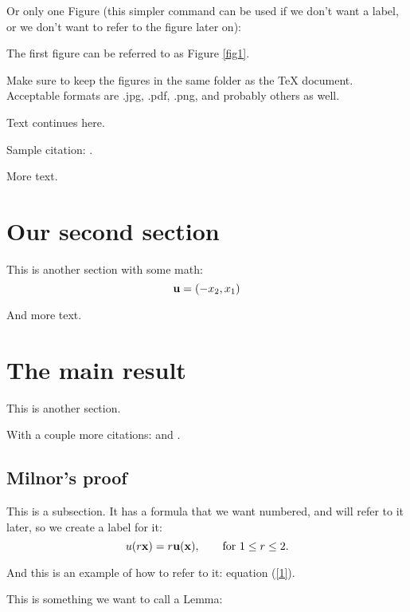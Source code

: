 \documentclass{amsart}
\theoremstyle{definition}
\numberwithin{equation}{section}
\def\ve#1{{\bf #1}}
\begin{document}
\begin{sansmath}
Or only one Figure
(this simpler command can be used if we don't want a label,
or we don't want to refer to the figure later on):

\medskip




The first figure can be referred to as  Figure \ref{fig1}.

Make sure to keep the figures in the same folder as the TeX document.
Acceptable formats are .jpg, .pdf, .png, and probably others as well.

Text continues here.

Sample citation:  \cite{alexandrov}.

More text.

\section{Our second section}

This is another section
with some math:
    $$ \ve u = (-x_2, x_1) $$


And more text.
    \medskip



\section{The main result}

This is another section.

With a couple more citations:
 \cite{alexandrov} and
 \cite{milnor}.


    \bigskip


\subsection{Milnor's proof}

This is a subsection.
It has a formula that we want numbered, and will refer to it later,
so we create a label for it:
    \begin{equation}
    \label{1}
    u(r \ve x) = r \ve u(\ve x) , \qquad \hbox{for $1 \le r \le 2$.}
    \end{equation}

And this is an example of how to refer to it: equation (\ref{1}).


This is something we want to call a Lemma:


\end{sansmath}
\end{document}
